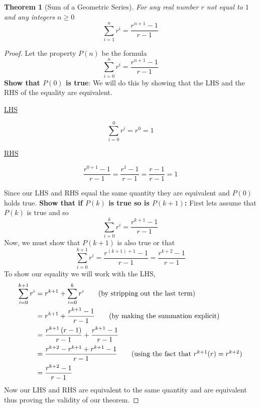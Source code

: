 \documentclass[addpoints]{exam}
\newtheorem{theorem}{Theorem}
\begin{document}
\begin{theorem}[Sum of a Geometric Series]
	For any real number $r$ not equal to $1$ and any integers $n \geq 0$
	\[
		\sum\limits_{i=1}^{n} r^{i} = \frac{r^{n+1} - 1}{r-1}
	\]
\end{theorem}
\ifprintanswers
	\begin{proof}
		Let the property $P(n)$ be the formula
		\[
			\sum\limits_{i=0}^{n} r^{i} = \frac{r^{n+1}-1}{r-1}
		\]
		\textbf{Show that $P(0)$ is true}: We will do this by showing that the LHS and the RHS of the equality are equivalent.
		\begin{minipage}[t]{0.45\linewidth}
			\begin{center}
				\underline{LHS}
			\end{center}
			\[
				\sum\limits_{i=0}^{0} r^{i} = r^{0} = 1
			\]
		\end{minipage}
		\hfill
		\begin{minipage}[t]{0.45\linewidth}
			\begin{center}
				\underline{RHS}
			\end{center}
			\[
				\frac{r^{0+1}-1}{r-1} = \frac{r^1-1}{r-1} = \frac{r-1}{r-1} = 1
			\]
		\end{minipage}
		\vspace{0.2in}\newline Since our LHS and RHS equal the same quantity they are equivalent and $P(0)$ holds true.
		\newline \textbf{Show that if $P(k)$ is true so is $P(k+1)$:} First lets assume that $P(k)$ is true and so
		\[
			\sum\limits_{i=0}^{k} r^i = \frac{r^{k+1}-1}{r-1}
		\]
		Now, we must show that $P(k+1)$ is also true or that
		\[
			\sum\limits_{i=0}^{k+1} r^i = \frac{r^{(k+1)+1}-1}{r-1} = \frac{r^{k+2}-1}{r-1}
		\]
		To show our equality we will work with the LHS,
		\begin{align*}
			\sum\limits_{i=0}^{k+1} r^i & = r^{k+1} + \sum\limits_{i=0}^{k} r^i \tag{by stripping out the last term}                   \\
			                            & = r^{k+1} + \frac{r^{k+1}-1}{r-1} \tag{by making the summation explicit}                     \\
			                            & = \frac{r^{k+1}\left(r-1\right)}{r-1} + \frac{r^{k+1}-1}{r-1}                                \\
			                            & = \frac{r^{k+2} - r^{k+1} + r^{k+1}-1}{r-1} \tag{using the fact that $r^{k+1}(r) = r^{k+2}$} \\
			                            & = \frac{r^{k+2}-1}{r-1}
		\end{align*}
		Now our LHS and RHS are equivalent to the same quantity and are equivalent thus proving the validity of our theorem.
	\end{proof}
\end{document}
